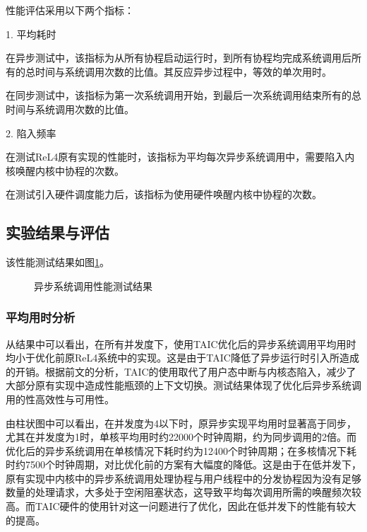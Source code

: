 性能评估采用以下两个指标：

1. 平均耗时

在异步测试中，该指标为从所有协程启动运行时，到所有协程均完成系统调用后所有的总时间与系统调用次数的比值。其反应异步过程中，等效的单次用时。

在同步测试中，该指标为第一次系统调用开始，到最后一次系统调用结束所有的总时间与系统调用次数的比值。

2. 陷入频率

在测试ReL4原有实现的性能时，该指标为平均每次异步系统调用中，需要陷入内核唤醒内核中协程的次数。

在测试引入硬件调度能力后，该指标为使用硬件唤醒内核中协程的次数。


\subsection{实验结果与评估}

该性能测试结果如图\ref{性能测试结果}。

\begin{figure}[htbp]
  \centering
  
  \caption{异步系统调用性能测试结果}\label{性能测试结果}
\end{figure}


\subsubsection{平均用时分析}

从结果中可以看出，在所有并发度下，使用TAIC优化后的异步系统调用平均用时均小于优化前原ReL4系统中的实现。这是由于TAIC降低了异步运行时引入所造成的开销。根据前文的分析，TAIC的使用取代了用户态中断与内核态陷入，减少了大部分原有实现中造成性能瓶颈的上下文切换。测试结果体现了优化后异步系统调用的性高效性与可用性。

由柱状图中可以看出，在并发度为4以下时，原异步实现平均用时显著高于同步，尤其在并发度为1时，单核平均用时约22000个时钟周期，约为同步调用的2倍。而优化后的异步系统调用在单核情况下耗时约为12400个时钟周期；在多核情况下耗时约7500个时钟周期，对比优化前的方案有大幅度的降低。这是由于在低并发下，原有实现中内核中的异步系统调用处理协程与用户线程中的分发协程因为没有足够数量的处理请求，大多处于空闲阻塞状态，这导致平均每次调用所需的唤醒频次较高。而TAIC硬件的使用针对这一问题进行了优化，因此在低并发下的性能有较大的提高。

